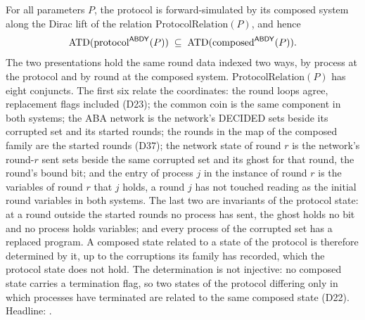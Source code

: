\begin{theorem}
  \label{thm:aba-protocol-composed}
  \leanok
  For all parameters $P$, the protocol is forward-simulated by its composed system along the Dirac lift of the relation $\mathrm{ProtocolRelation}(P)$, and hence
  \[
    \operatorname{ATD}(\mathrm{protocol}^{\mathsf{ABDY}}(P)) \;\subseteq\;
    \operatorname{ATD}(\mathrm{composed}^{\mathsf{ABDY}}(P)).
  \]
  The two presentations hold the same round data indexed two ways, by process at the protocol and by round at the composed system.
  $\mathrm{ProtocolRelation}(P)$ has eight conjuncts.
  The first six relate the coordinates: the round loops agree, replacement flags included (D23); the common coin is the same component in both systems; the ABA network is the network's DECIDED sets beside its corrupted set and its started rounds; the rounds in the map of the composed family are the started rounds (D37); the network state of round $r$ is the network's round-$r$ sent sets beside the same corrupted set and its ghost for that round, the round's bound bit; and the entry of process $j$ in the instance of round $r$ is the variables of round $r$ that $j$ holds, a round $j$ has not touched reading as the initial round variables in both systems.
  The last two are invariants of the protocol state: at a round outside the started rounds no process has sent, the ghost holds no bit and no process holds variables; and every process of the corrupted set has a replaced program.
  A composed state related to a state of the protocol is therefore determined by it, up to the corruptions its family has recorded, which the protocol state does not hold.
  The determination is not injective: no composed state carries a termination flag, so two states of the protocol differing only in which processes have terminated are related to the same composed state (D22).
  Headline: .
\end{theorem}


